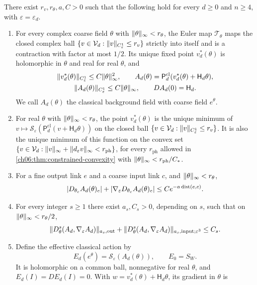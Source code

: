 \begin{theorem}\label{ch07:thm:regular-minimum}
There exist $r_v,r_\theta,a,C>0$ such that the following hold for every $d\ge0$ and $n\ge4$, with $\varepsilon=\varepsilon_d$.
\begin{enumerate}
\item For every complex coarse field $\theta$ with $\lVert \theta\rVert_\infty<r_\theta$, the Euler map $\mathcal T_\theta$ maps the closed complex ball $\{v\in\mathcal V_d:\lVert v\rVert_{C^1_\varepsilon}\le r_v\}$ strictly into itself and is a contraction with factor at most $1/2$. Its unique fixed point $v_d^*(\theta)$ is holomorphic in $\theta$ and real for real $\theta$, and
\begin{gather*}
 \lVert v_d^*(\theta)\rVert_{C^1_\varepsilon}\le C\lVert \theta\rVert_\infty^2,\qquad
 A_d(\theta)=\mathsf P_d^{\mathrm{cl}}(v_d^*(\theta)+\mathsf H_d\theta),\\
 \lVert A_d(\theta)\rVert_{C^1_\varepsilon}\le C\lVert \theta\rVert_\infty,\qquad
 DA_d(0)=\mathsf H_d .
\end{gather*}
We call $A_d(\theta)$ the classical background field with coarse field $e^\theta$.
\item For real $\theta$ with $\lVert \theta\rVert_\infty<r_\theta$, the point $v_d^*(\theta)$ is the unique minimum of $v\mapsto\mathscr S_\varepsilon(\mathsf P_d^{\mathrm{cl}}(v+\mathsf H_d\theta))$ on the closed ball $\{v\in\mathcal V_d:\lVert v\rVert_{C^1_\varepsilon}\le r_v\}$. It is also the unique minimum of this function on the convex set $\{v\in\mathcal V_d:\lVert v\rVert_\infty+\lVert d_\varepsilon v\rVert_\infty<r_{\mathrm{ph}}\}$, for every $r_{\mathrm{ph}}$ allowed in \cref{ch06:thm:constrained-convexity} with $\lVert \theta\rVert_\infty<r_{\mathrm{ph}}/C_*$.
\item For a fine output link $e$ and a coarse input link $c$, and $\lVert \theta\rVert_\infty<r_\theta$,
\[
 \lvert D_{\theta_c}A_d(\theta)_e\rvert+\lvert \nabla_\varepsilon D_{\theta_c}A_d(\theta)_e\rvert\le Ce^{-a\operatorname{dist}(e,c)}.
\]
\item For every integer $s\ge1$ there exist $a_s,C_s>0$, depending on $s$, such that on $\lVert \theta\rVert_\infty<r_\theta/2$,
\[
 \lVert D_\theta^s(A_d,\nabla_\varepsilon A_d)\rVert_{a_s,\mathrm{out}}
 +\lVert D_\theta^s(A_d,\nabla_\varepsilon A_d)\rVert_{a_s,\mathrm{input};\varepsilon^3}\le C_s .
\]
\item Define the effective classical action by
\[
 E_d(e^\theta)=\mathscr S_\varepsilon(A_d(\theta)),\qquad E_0=S_W .
\]
It is holomorphic on a common ball, nonnegative for real $\theta$, and $E_d(I)=DE_d(I)=0$. With $w=v_d^*(\theta)+\mathsf H_d\theta$, its gradient in $\theta$ is

\end{enumerate}
\end{theorem}
